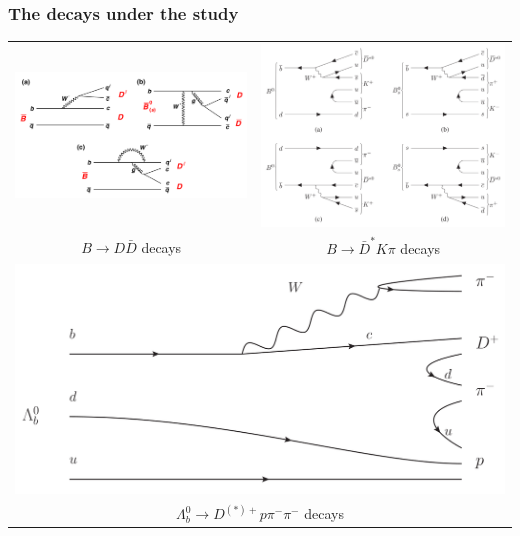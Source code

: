 \documentclass[10pt, aspectratio=169]{beamer}
\def\Lb{{\Lambda_b^0}}
\def\pim{{\pi^-}}
\begin{document}
\begin{frame}[label=decays]%
  \frametitle{The decays under the study}

  \centering

  \begin{tabular}{cc}
    \includegraphics[width=.4\linewidth]{figures/conf/B2DD-fig001} &
    \includegraphics[width=.3\linewidth]{figures/conf/B2DKpi-fig001} \\
    $B \to D\bar{D}$ decays &
    $B \to \bar{D}^* K \pi $ decays \\

    \multicolumn{2}{c}{
      \includegraphics[width=.3\linewidth]{figures/conf/Lb2Dppipi-fig000}
    } \\
    \multicolumn{2}{c}{
      $\Lb\to D^{(*)+} p \pim\pim$ decays
    } \\
  \end{tabular}

\end{frame}%
\end{document}
